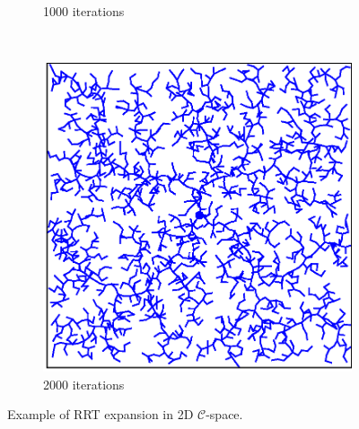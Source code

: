 \documentclass{beamer}
\begin{document}
\begin{frame}
\begin{figure}[!ht]
\begin{subfigure}[b]{0.3\textwidth}
			\caption{1000 iterations}
		\end{subfigure}
		~ %
		\begin{subfigure}[b]{0.3\textwidth}
			\includegraphics[width=\textwidth]{figChap3/2RRTexpansion2000.eps}
			\caption{2000 iterations}
		\end{subfigure}
		\caption{Example of RRT expansion in 2D $\mathcal{C}$-space.}
		\label{fig:RRTgrowing}
	  \end{figure} 
\end{frame}	
\end{document}
